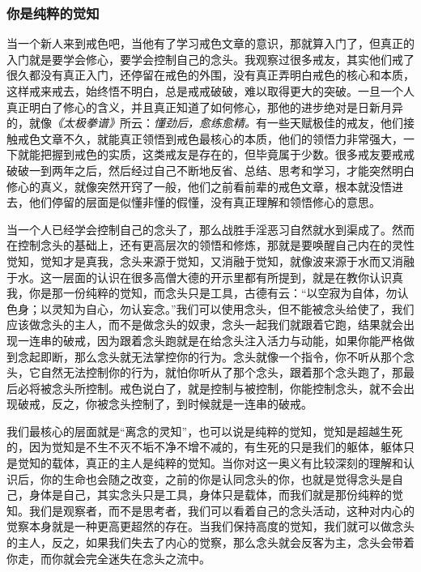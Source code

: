 \subsubsection{你是纯粹的觉知}

当一个新人来到戒色吧，当他有了学习戒色文章的意识，那就算入门了，但真正的入门就是要学会修心，要学会控制自己的念头。我观察过很多戒友，其实他们戒了很久都没有真正入门，还停留在戒色的外围，没有真正弄明白戒色的核心和本质，这样戒来戒去，始终悟不明白，总是戒戒破破，难以取得更大的突破。一旦一个人真正明白了修心的含义，并且真正知道了如何修心，那他的进步绝对是日新月异的，就像\textit{《太极拳谱》}所云：\textit{懂劲后，愈练愈精。}有一些天赋极佳的戒友，他们接触戒色文章不久，就能真正领悟到戒色最核心的本质，他们的领悟力非常强大，一下就能把握到戒色的实质，这类戒友是存在的，但毕竟属于少数。很多戒友要戒戒破破一到两年之后，然后经过自己不断地反省、总结、思考和学习，才能突然明白修心的真义，就像突然开窍了一般，他们之前看前辈的戒色文章，根本就没悟进去，他们停留的层面是似懂非懂的假懂，没有真正理解和领悟修心的意思。

当一个人已经学会控制自己的念头了，那么战胜手淫恶习自然就水到渠成了。然而在控制念头的基础上，还有更高层次的领悟和修炼，那就是要唤醒自己内在的灵性觉知，觉知才是真我，念头来源于觉知，又消融于觉知，就像波来源于水而又消融于水。这一层面的认识在很多高僧大德的开示里都有所提到，就是在教你认识真我，你是那一份纯粹的觉知，而念头只是工具，古德有云：“以空寂为自体，勿认色身；以灵知为自心，勿认妄念。”我们可以使用念头，但不能被念头给使了，我们应该做念头的主人，而不是做念头的奴隶，念头一起我们就跟着它跑，结果就会出现一连串的破戒，因为跟着念头跑就是在给念头注入活力与动能，如果你能严格做到念起即断，那么念头就无法掌控你的行为。念头就像一个指令，你不听从那个念头，它自然无法控制你的行为，就怕你听从了那个念头，跟着那个念头跑了，那最后必将被念头所控制。戒色说白了，就是控制与被控制，你能控制念头，就不会出现破戒，反之，你被念头控制了，到时候就是一连串的破戒。

我们最核心的层面就是“离念的灵知”，也可以说是纯粹的觉知，觉知是超越生死的，因为觉知是不生不灭不垢不净不增不减的，有生死的只是我们的躯体，躯体只是觉知的载体，真正的主人是纯粹的觉知。当你对这一奥义有比较深刻的理解和认识后，你的生命也会随之改变，之前的你是认同念头的你，也就是觉得念头是自己，身体是自己，其实念头只是工具，身体只是载体，而我们就是那份纯粹的觉知。我们是观察者，而不是思考者，我们可以看着自己的念头活动，这种对内心的觉察本身就是一种更高更超然的存在。当我们保持高度的觉知，我们就可以做念头的主人，反之，如果我们失去了内心的觉察，那么念头就会反客为主，念头会带着你走，而你就会完全迷失在念头之流中。

